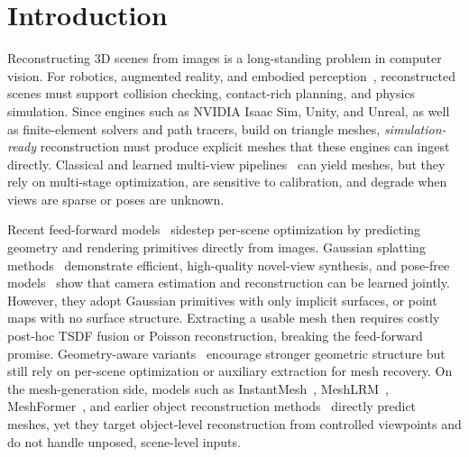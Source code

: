\documentclass{llmxive}
\begin{document}
\section{Introduction}

Reconstructing 3D scenes from images is a long-standing problem in computer vision.
For robotics, augmented reality, and embodied perception~\citep{qureshi2024splatsim,chhablani2025embodiedsplat}, reconstructed scenes must support collision checking, contact-rich planning, and physics simulation.
Since engines such as NVIDIA Isaac Sim, Unity, and Unreal, as well as finite-element solvers and path tracers, build on triangle meshes, \emph{simulation-ready} reconstruction must produce explicit meshes that these engines can ingest directly.
Classical and learned multi-view pipelines~\citep{schoenberger2016sfm,schoenberger2016mvs,furukawa2015multi} can yield meshes, but they rely on multi-stage optimization, are sensitive to calibration, and degrade when views are sparse or poses are unknown.


Recent feed-forward models~\citep{yu2021pixelnerf,chen2021mvsnerf,chen2024mvsplat,zhang2025advances} sidestep per-scene optimization by predicting geometry and rendering primitives directly from images.
Gaussian splatting methods~\citep{kerbl20233d,charatan2024pixelsplat,chen2024mvsplat,xu2024depthsplat,wang2025volsplat} demonstrate efficient, high-quality novel-view synthesis, and pose-free models~\citep{wang2024dust3r,zhang2025flare,wang2025vggt,ye2024no,ye2025yonosplat} show that camera estimation and reconstruction can be learned jointly.
However, they adopt Gaussian primitives with only implicit surfaces, or point maps with no surface structure. Extracting a usable mesh then requires costly post-hoc TSDF fusion or Poisson reconstruction, breaking the feed-forward promise.
Geometry-aware variants~\citep{huang20242d,yu2024gaussian,lyu20243dgsr,chang2025meshsplat,daisurfelsplat} encourage stronger geometric structure but still rely on per-scene optimization or auxiliary extraction for mesh recovery.
On the mesh-generation side, models such as InstantMesh~\citep{xu2024instantmesh}, MeshLRM~\citep{wei2024meshlrm}, MeshFormer~\citep{liu2024meshformer}, and earlier object reconstruction methods~\citep{choy20163d,kanazawa2018learning,wang2018pixel2mesh} directly predict meshes, yet they target object-level reconstruction from controlled viewpoints and do not handle unposed, scene-level inputs.
\end{document}
